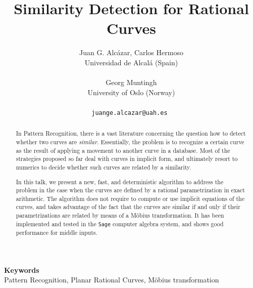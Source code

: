 \documentclass[a4paper]{article} %
\date{} %
\def\keywords#1{\begin{center}{\bf Keywords}\\{#1}\end{center}} %
\def\titulo#1{\title{#1}} %
\def\autores#1{\author{#1}} %
\begin{document}
\titulo{Similarity Detection for Rational Curves}

\autores{Juan G. Alc\'azar, Carlos Hermoso \\ %
       Universidad de Alcal\'a (Spain) \\ \\ %
       Georg Muntingh \\ %
       University of Oslo (Norway) \\ \\ %
       \tt{juange.alcazar@uah.es} %
       }%


\maketitle

\thispagestyle{empty}




\begin{abstract}
In Pattern Recognition, there is a vast literature concerning the question how to detect whether two curves are \emph{similar}. Essentially, the problem is to recognize a certain curve as the result of applying a movement to another curve in a database. Most of the strategies proposed so far deal with curves in implicit form, and ultimately resort to numerics to decide whether such curves are related by a similarity.

In this talk, we present a new, fast, and deterministic algorithm to address the problem in the case when the curves are defined by a rational 
parametrization in exact arithmetic. The algorithm does not require to compute or use implicit equations of the curves, and takes advantage of the fact that the curves are similar if and only if their parametrizations are related by means of a M\"obius transformation. It has been implemented and tested in the {\tt Sage}
computer algebra system, and shows good performance for middle inputs.
\end{abstract}

\keywords{Pattern Recognition, Planar Rational Curves, M\"obius transformation} %






\end{document}
